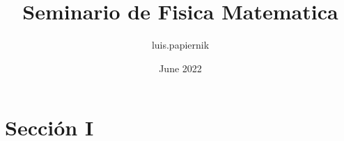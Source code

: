 \documentclass{article}
\title{Seminario de Fisica Matematica}
\author{luis.papiernik }
\date{June 2022}
\begin{document}
\maketitle

\section{Sección I}
\end{document}
